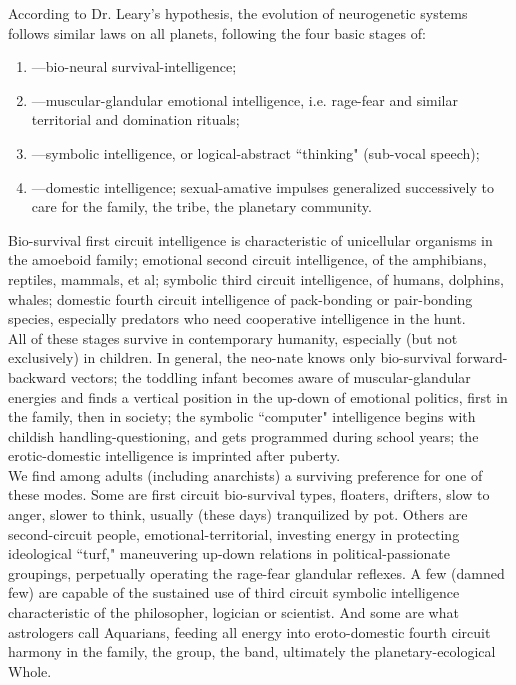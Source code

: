 \documentclass[12pt, onecolumn, letterpaper, oneside]{book}
\begin{document}
According to Dr. Leary's hypothesis, the evolution of neurogenetic systems follows similar laws on all planets, following the four basic stages of:
\begin{enumerate}
\item ---bio-neural survival-intelligence;
\item ---muscular-glandular emotional intelligence, i.e. rage-fear and similar territorial and domination rituals;
\item ---symbolic intelligence, or logical-abstract ``thinking" (sub-vocal speech);
\item ---domestic intelligence; sexual-amative impulses generalized successively to care for the family, the tribe, the planetary community.
\end{enumerate}
Bio-survival first circuit intelligence is characteristic of unicellular organisms in the amoeboid family; emotional second circuit intelligence, of the amphibians, reptiles, mammals, et al; symbolic third circuit intelligence, of humans, dolphins, whales; domestic fourth circuit intelligence of pack-bonding or pair-bonding species, especially predators who need cooperative intelligence in the hunt.\\
All of these stages survive in contemporary humanity, especially (but not exclusively) in children. In general, the neo-nate knows only bio-survival forward-backward vectors; the toddling infant becomes aware of muscular-glandular energies and finds a vertical position in the up-down of emotional politics, first in the family, then in society; the symbolic ``computer" intelligence begins with childish handling-questioning, and gets programmed during school years; the erotic-domestic intelligence is imprinted after puberty.\\
We find among adults (including anarchists) a surviving preference for one of these modes. Some are first circuit bio-survival types, floaters, drifters, slow to anger, slower to think, usually (these days) tranquilized by pot. Others are second-circuit people, emotional-territorial, investing energy in protecting ideological ``turf," maneuvering up-down relations in political-passionate groupings, perpetually operating the rage-fear glandular reflexes. A few (damned few) are capable of the sustained use of third circuit symbolic intelligence characteristic of the philosopher, logician or scientist. And some are what astrologers call Aquarians, feeding all energy into eroto-domestic fourth circuit harmony in the family, the group, the band, ultimately the planetary-ecological Whole.\\
\end{document}
